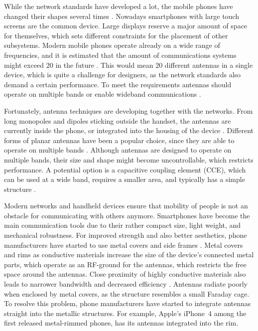 While the network standards have developed a lot, the mobile phones have changed their shapes several times \cite{anguera2}. Nowadays smartphones with large touch screens are the common device. Large displays reserve a major amount of space for themselves, which sets different constraints for the placement of other subsystems. Modern mobile phones operate already on a wide range of frequencies, and it is estimated that the amount of communications systems might exceed 20 in the future \cite{20ant}. This would mean 20 different antennas in a single device, which is quite a challenge for designers, as the network standards also demand a certain performance. To meet the requirements antennas should operate on multiple bands or enable wideband communications \cite{lehtovuori_wideband_match}.

Fortunately, antenna techniques are developing together with the networks. From long monopoles and dipoles sticking outside the handset, the antennas are currently inside the phone, or integrated into the housing of the device \cite{saunders,molisch}. Different forms of planar antennas have been a popular choice, since they are able to operate on multiple bands \cite{anguera}. Although antennas are designed to operate on multiple bands, their size and shape might become uncontrollable, which restricts performance. A potential option is a capacitive coupling element (CCE), which can be used at a wide band, requires a smaller area, and typically has a simple structure \cite{valkonen_cce2}.

Modern networks and handheld devices ensure that mobility of people is not an obstacle for communicating with others anymore. Smartphones have become the main communication tools due to their rather compact size, light weight, and mechanical robustness. For improved strength and also better aesthetics, phone manufacturers have started to use metal covers and side frames \cite{rowell}. Metal covers and rims as conductive materials increase the size of the device's connected metal parts, which operate as an RF-ground for the antennas, which restricts the free space around the antennas. Close proximity of highly conductive materials also leads to narrower bandwidth and decreased efficiency \cite{rowell}. Antennas radiate poorly when enclosed by metal covers, as the structure resembles a small Faraday cage. To resolve this problem, phone manufacturers have started to integrate antennas straight into the metallic structures. For example, Apple's iPhone~4 among the first released metal-rimmed phones, has its antennas integrated into the rim. 

